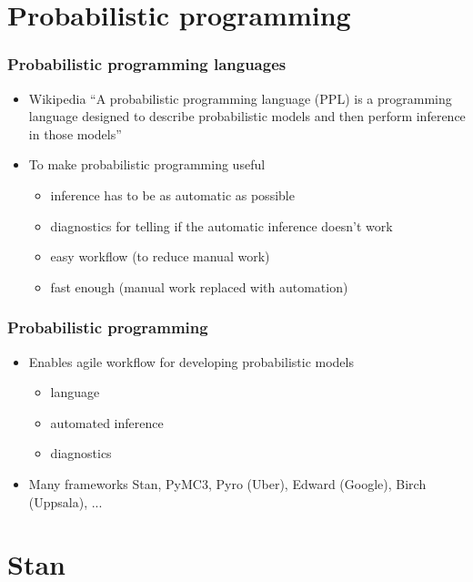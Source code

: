\documentclass[10pt]{beamer}
\begin{document}
\section{Probabilistic programming}
\frame{\sectionpage}


\begin{frame}

\frametitle{Probabilistic programming languages}

  \begin{itemize}
  \item Wikipedia ``A probabilistic programming language (PPL) is a
    programming language designed to describe probabilistic models
    and then perform inference in those models''
    \pause
  \item To make probabilistic programming useful
    \begin{itemize}
    \item inference has to be as automatic as possible
    \item diagnostics for telling if the automatic inference doesn't work
    \item easy workflow (to reduce manual work)
    \item fast enough (manual work replaced with automation)
    \end{itemize}
  \end{itemize}
\end{frame}

\begin{frame}

\frametitle{Probabilistic programming}

  \begin{itemize}
  \item Enables agile workflow for developing probabilistic models
    \begin{itemize}
    \item language
    \item automated inference
    \item diagnostics
    \end{itemize}
  \item Many frameworks
    Stan, PyMC3, Pyro (Uber), Edward (Google), Birch (Uppsala), ...
  \end{itemize}

\end{frame}

\section{Stan}
\frame{\sectionpage}
\end{document}
